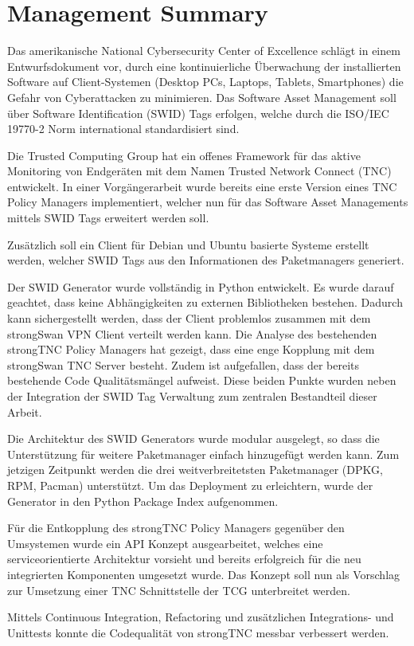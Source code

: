 \chapter{Management Summary}


Das amerikanische National Cybersecurity Center of Excellence schlägt in einem
Entwurfsdokument vor, durch eine kontinuierliche Überwachung der installierten
Software auf Client-Systemen (Desktop PCs, Laptops, Tablets, Smartphones) die
Gefahr von Cyberattacken zu minimieren. Das Software Asset Management soll über
Software Identification (SWID) Tags erfolgen, welche durch die ISO/IEC
19770-2\cite{iso19770-2} Norm international standardisiert sind.

Die Trusted Computing Group hat ein offenes Framework für das aktive Monitoring
von Endgeräten mit dem Namen Trusted Network Connect (TNC) entwickelt. In einer
Vorgängerarbeit wurde bereits eine erste Version eines TNC Policy Managers
implementiert, welcher nun für das Software Asset Managements mittels SWID Tags
erweitert werden soll.

Zusätzlich soll ein Client für Debian und Ubuntu basierte Systeme erstellt
werden, welcher SWID Tags aus den Informationen des Paketmanagers generiert.


Der SWID Generator wurde vollständig in Python entwickelt. Es wurde darauf
geachtet, dass keine Abhängigkeiten zu externen Bibliotheken bestehen. Dadurch
kann sichergestellt werden, dass der Client problemlos zusammen mit dem
strongSwan VPN Client verteilt werden kann. Die Analyse des bestehenden
strongTNC Policy Managers hat gezeigt, dass eine enge Kopplung mit dem
strongSwan TNC Server besteht. Zudem ist aufgefallen, dass der bereits
bestehende Code Qualitätsmängel aufweist. Diese beiden Punkte wurden neben der
Integration der SWID Tag Verwaltung zum zentralen Bestandteil dieser Arbeit.


Die Architektur des SWID Generators wurde modular ausgelegt, so dass die
Unterstützung für weitere Paketmanager einfach hinzugefügt werden kann. Zum
jetzigen Zeitpunkt werden die drei weitverbreitetsten Paketmanager (DPKG,
RPM, Pacman) unterstützt. Um das Deployment zu erleichtern, wurde der Generator
in den Python Package Index aufgenommen.

Für die Entkopplung des strongTNC Policy Managers gegenüber den Umsystemen wurde
ein API Konzept ausgearbeitet, welches eine serviceorientierte Architektur
vorsieht und bereits erfolgreich für die neu integrierten Komponenten umgesetzt
wurde. Das Konzept soll nun als Vorschlag zur Umsetzung einer TNC Schnittstelle
der TCG unterbreitet werden.

Mittels Continuous Integration, Refactoring und zusätzlichen Integrations- und
Unittests konnte die Codequalität von strongTNC messbar verbessert werden.
